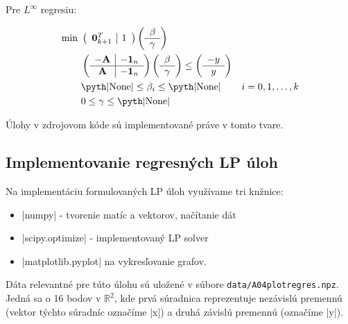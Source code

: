 \documentclass[report.tex]{subfiles}
\begin{document}
Pre $L^{\infty}$ regresiu:

\begin{align*}
	\text{min}~ &
	\left(
	\begin{array}{c|c}
		\mathbf{0}_{k+1}^T & 1
	\end{array}
	\right)
	\left(
	\begin{array}{c}
		\beta \\
		\hline
		\gamma
	\end{array}
	\right) \\
	&\left(
	\begin{array}{c|c}
		-\mathbf{A} & -\mathbf{1}_n \\
		\hline
		\mathbf{A} & -\mathbf{1}_n
	\end{array}
	\right)
	\left(
	\begin{array}{c}
		\beta \\
		\hline
		\gamma
	\end{array}
	\right)
	\leq
	\left(
	\begin{array}{c}
		-y \\
		\hline
		y
	\end{array}
	\right) \\
	&\text{\pyth|None|} \leq \beta_i \leq \text{\pyth|None|} &i = 0,1,\dots,k\\
	&0 \leq \gamma \leq \text{\pyth|None|}
\end{align*}

Úlohy v zdrojovom kóde sú implementované práve v tomto tvare.

\subsection{Implementovanie regresných LP úloh}

Na implementáciu formulovaných LP úloh využívame tri knžnice:

\begin{itemize}
	\item \pyth|numpy| - tvorenie matíc a vektorov, načítanie dát
	\item \pyth|scipy.optimize| - implementovaný LP solver
	\item \pyth|matplotlib.pyplot| na vykresľovanie grafov.
\end{itemize}

Dáta relevantné pre túto úlohu sú uložené v súbore \verb|data/A04plotregres.npz|. Jedná sa o 16 bodov v $\mathbb{R}^2$, kde prvá súradnica reprezentuje nezávislú premennú (vektor týchto súradníc označíme \pyth|x|) a druhá závislú premennú (označíme \pyth|y|). 
\end{document}
